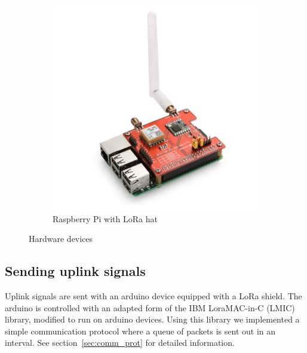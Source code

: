 \begin{figure}
    \hspace{2em}
    \begin{subfigure}[b]{0.25\textwidth}
     \includegraphics[width=1\textwidth]{figures/raspberry.png}
     \caption{Raspberry Pi with LoRa hat}
    \end{subfigure}
    \caption{Hardware devices}
   \end{figure}
\subsection{Sending uplink signals}
Uplink signals are sent with an arduino device equipped with a LoRa shield. 
The arduino is controlled with an adapted form of the IBM LoraMAC-in-C (LMIC) library, modified to run on arduino devices.
Using this library we implemented a simple communication protocol where a queue of packets is sent out in an interval.
See section~\ref{sec:comm_prot} for detailed information.
